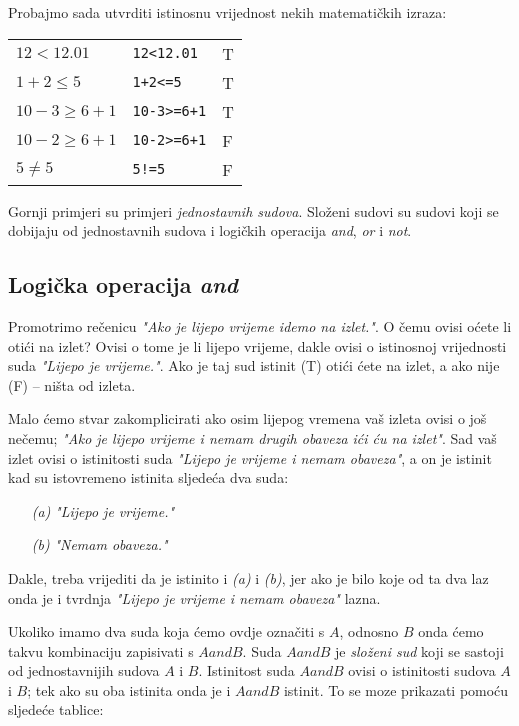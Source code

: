 Probajmo sada utvrditi istinosnu vrijednost nekih matematičkih izraza:

\begin{tabular}{lll}
	$12<12.01$ & \verb+12<12.01+ & T\\
	$1+2\leq 5$ & \verb"1+2<=5" & T\\
	$10-3\geq 6+1$ & \verb"10-3>=6+1" & T \\
	$10-2\geq 6+1$ & \verb"10-2>=6+1" & F \\
	$5\neq 5$ & \verb"5!=5" & F
\end{tabular}

Gornji primjeri su primjeri \emph{jednostavnih sudova}. Složeni
sudovi su sudovi koji se dobijaju od jednostavnih sudova i logičkih
operacija \emph{and}, \emph{or} i \emph{not}.

\subsection{Logička operacija \emph{and}}

Promotrimo rečenicu \emph{"Ako je lijepo vrijeme
idemo na izlet."}. O čemu ovisi oćete li
otići na izlet? Ovisi o tome je li lijepo vrijeme, dakle ovisi o
istinosnoj vrijednosti suda \emph{"Lijepo je vrijeme."}. Ako je
taj sud istinit (T) otići ćete na izlet, a ako nije (F) -- ništa
od izleta.

Malo ćemo stvar zakomplicirati ako osim lijepog vremena vaš izleta
ovisi o još nečemu; \emph{"Ako je lijepo vrijeme i nemam drugih obaveza
ići ću na izlet"}.
Sad vaš izlet ovisi o istinitosti suda \emph{"Lijepo je vrijeme i nemam obaveza"}, a on je istinit
kad su istovremeno istinita sljedeća dva suda:

\begin{itemize}
	\item[\emph{(a)}] \emph{"Lijepo je vrijeme."}
	\item[\emph{(b)}] \emph{"Nemam obaveza."}
\end{itemize}

Dakle, treba vrijediti da je istinito i \emph{(a)} i \emph{(b)},
jer ako je bilo koje od ta dva laz onda je i tvrdnja \emph{"Lijepo
je vrijeme i nemam obaveza"} lazna.

Ukoliko imamo dva suda koja ćemo ovdje označiti s $A$, odnosno
$B$ onda ćemo takvu kombinaciju zapisivati s $A and B$. Suda $A
and B$ je \emph{složeni sud} koji se sastoji od jednostavnijih
sudova $A$ i $B$. Istinitost suda $A and B$ ovisi o istinitosti
sudova $A$ i $B$; tek ako su oba istinita onda je i $A and B$
istinit. To se moze prikazati pomoću sljedeće tablice:

